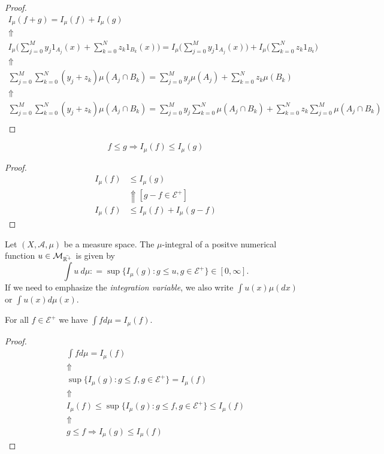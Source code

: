\begin{proof}
\begin{gather*}
I_\mu (f+g)=I_\mu (f)+I_\mu (g) \\
\Uparrow  \\
I_\mu \Big(\sum _{j=0}^My_{j}1_{A_{j}}(x)+\sum _{k=0}^{N}z_{k}1_{B_{k}}(x)\Big)=I_\mu \Big(\sum _{j=0}^My_{j}1_{A_{j}}(x)\Big)+I_\mu \Big(\sum _{k=0}^{N}z_{k}1_{B_{k}}\Big)\\
\Uparrow \\
\sum _{j=0}^M\sum _{k=0}^N(y_{j}+z_{k})\mu (A_{j}\cap B_{k})=\sum _{j=0}^My_{j}\mu (A_{j})+\sum _{k=0}^Nz_{k}\mu (B_{k}) \\
\Uparrow  \\
\sum _{j=0}^M\sum _{k=0}^N(y_{j}+z_{k})\mu (A_{j}\cap B_{k})=\sum _{j=0}^My_{j} \sum _{k=0}^N\mu (A_{j}\cap B_{k})+\sum _{k=0}^Nz_{k} \sum _{j=0}^M\mu (A_{j}\cap B_{k})\\ 
\end{gather*}
\end{proof}
\newpage
\begin{prop}
\[
f\leq g \Longrightarrow I_\mu (f)\leq I_\mu (g)
\]
\end{prop}

\begin{proof}
\begin{align*}
I_\mu (f)&\leq I_\mu (g) \\
&\Uparrow [g-f\in \mathcal{E}^+] \\
I_\mu (f)&\leq  I_\mu (f)+I_\mu (g-f)
\end{align*}
\end{proof}

\begin{defn}
Let \((X,\mathcal{A},\mu )\) be a measure space. The \(\mu \)-integral of a positve numerical function \(u\in \mathcal{M}_{\bar{\Bbb{R}^+}}\) is given by
\[
\int  u\  d\mu  : = \sup\{I_\mu (g):g\leq u, g\in \mathcal{E}^+\}\in [0,\infty ].
\]
If we need to emphasize the \emph{integration variable}, we also write \(\int  u(x) \mu (dx)\) or \(\int u(x)d\mu (x).\)
\end{defn}

\begin{prop}
For all \(f\in \mathcal{E}^+\) we have \(\int fd\mu =I_\mu (f).\)
\end{prop}

\begin{proof}
\begin{gather*}
\int fd\mu =I_\mu (f) \\
\Uparrow \\
\sup\{I_\mu (g):g\leq f, g\in \mathcal{E}^+\}=I_\mu (f) \\
\Uparrow  \\
I_\mu (f)\leq \sup\{I_\mu (g):g\leq f, g\in \mathcal{E}^+\}\leq I_\mu (f)\\
\Uparrow \\
g\leq f \Longrightarrow  I_\mu (g)\leq I_\mu (f)
\end{gather*}
\end{proof}



